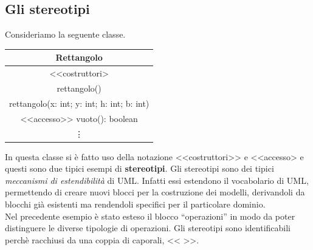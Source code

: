 \documentclass[12pt]{report}
\begin{document}
\subsection{Gli stereotipi}
Consideriamo la seguente classe.
\begin{center}
	\begin{tabular}{|c|}
		\hline
		Rettangolo \\
		\hline
		<<costruttori>\\
		rettangolo() \\
		rettangolo(x: int; y: int; h: int; b: int) \\
		<<accesso>>
		vuoto(): boolean \\
		\vdots \\
		\hline
	\end{tabular}
\end{center}
In questa classe si è fatto uso della notazione <<costruttori>> e <<accesso> e questi sono due tipici esempi di \textbf{stereotipi}. Gli stereotipi sono dei tipici \textit{meccanismi di estendibilità} di UML. Infatti essi estendono il vocabolario di UML, permettendo di creare nuovi blocci per la costruzione dei modelli, derivandoli da blocchi già esistenti ma rendendoli specifici per il particolare dominio. \\
Nel precedente esempio è stato esteso il blocco ``operazioni'' in modo da poter distinguere le diverse tipologie di operazioni. Gli stereotipi sono identificabili perchè racchiusi da una coppia di caporali, << >>.
\end{document}
